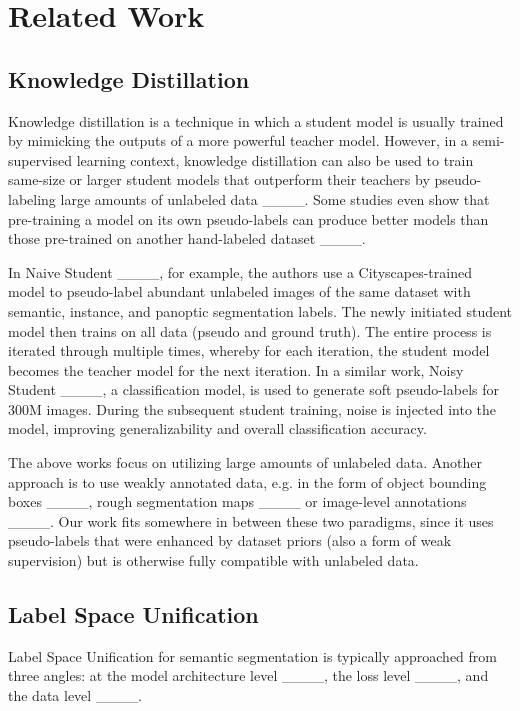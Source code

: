 \section{Related Work}
\subsection{Knowledge Distillation}
Knowledge distillation is a technique in which a student model is usually trained by mimicking the outputs of a more powerful teacher model.
However, in a semi-supervised learning context, knowledge distillation can also be used to train same-size or larger student models that outperform their teachers by pseudo-labeling large amounts of unlabeled data ____.
Some studies even show that pre-training a model on its own pseudo-labels can produce better models than those pre-trained on another hand-labeled dataset ____.

In Naive Student ____, for example, the authors use a Cityscapes-trained model to pseudo-label abundant unlabeled images of the same dataset with semantic, instance, and panoptic segmentation labels.
The newly initiated student model then trains on all data (pseudo and ground truth).
The entire process is iterated through multiple times, whereby for each iteration, the student model becomes the teacher model for the next iteration.
In a similar work, Noisy Student ____, a classification model, is used to generate soft pseudo-labels for 300M images.
During the subsequent student training, noise is injected into the model, improving generalizability and overall classification accuracy.

The above works focus on utilizing large amounts of unlabeled data.
Another approach is to use weakly annotated data, e.g. in the form of object bounding boxes ____, rough segmentation maps ____ or image-level annotations ____.
Our work fits somewhere in between these two paradigms, since it uses pseudo-labels that were enhanced by dataset priors (also a form of weak supervision) but is otherwise fully compatible with unlabeled data.

\subsection{Label Space Unification}

Label Space Unification for semantic segmentation is typically approached from three angles: at the model architecture level ____, the loss level ____, and the data level ____.

